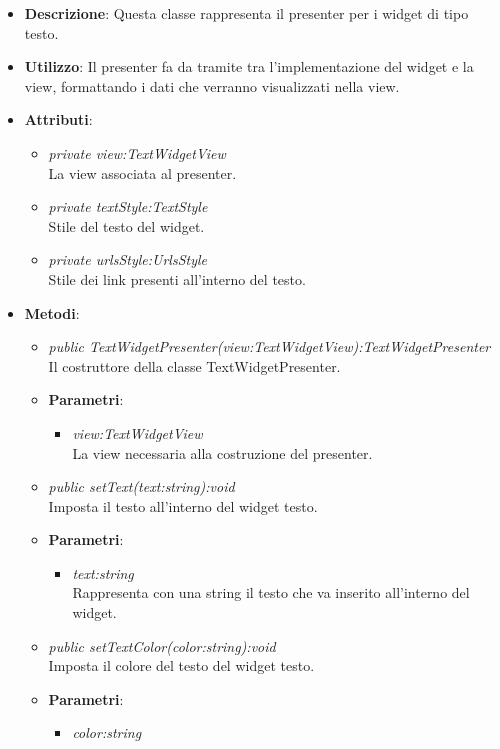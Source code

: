 \begin{itemize}
\item \textbf{Descrizione}: Questa classe rappresenta il presenter per i widget di tipo testo.
\item \textbf{Utilizzo}: Il presenter fa da tramite tra l'implementazione del widget e la view,  formattando i dati che verranno visualizzati nella view.
\item \textbf{Attributi}:
	\begin{itemize}
	\item \textit{private view:TextWidgetView}\\
	La view associata al presenter.
	\item \textit{private textStyle:TextStyle}\\
	Stile del testo del widget.
	\item \textit{private urlsStyle:UrlsStyle}\\
	Stile dei link presenti all'interno del testo.
	\end{itemize}
\item \textbf{Metodi}:
	\begin{itemize}
	\item \textit{public TextWidgetPresenter(view:TextWidgetView):TextWidgetPresenter}\\
	Il costruttore della classe TextWidgetPresenter.
		\item{\textbf{Parametri}: \begin{itemize}
		\item \textit{view:TextWidgetView}\\
		La view necessaria alla costruzione del presenter.
		\end{itemize}}
	\item \textit{public setText(text:string):void}\\
	Imposta il testo all'interno del widget testo.
		\item{\textbf{Parametri}: \begin{itemize}
		\item \textit{text:string}\\
		Rappresenta con una string il testo che va inserito all'interno del widget.
		\end{itemize}}
	\item \textit{public setTextColor(color:string):void}\\
	Imposta il colore del testo del widget testo.
		\item{\textbf{Parametri}: \begin{itemize}
		\item \textit{color:string}\\

\end{itemize}}
\end{itemize}
\end{itemize}
